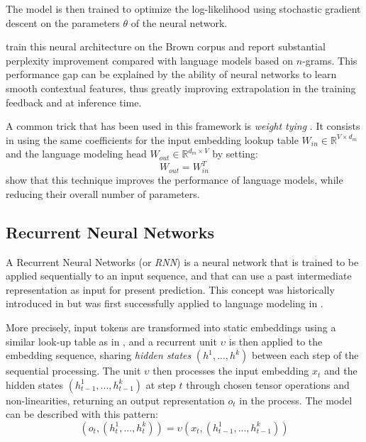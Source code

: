 The model is then trained to optimize the log-likelihood using stochastic gradient descent \citep{sgd} on the parameters $\theta$ of the neural network.

\citet{bengio2000neural} train this neural architecture on the Brown corpus \citep{francis79browncorpus} and report substantial perplexity improvement compared with language models based on $n$-grams. This performance gap can be explained by the ability of neural networks to learn smooth contextual features, thus greatly improving extrapolation in the training feedback and at inference time.

A common trick that has been used in this framework is \textit{weight tying} \citep{press-wolf-2017-using}. It consists in using the same coefficients for the input embedding lookup table $W_{in} \in \mathbb{R}^{V \times d_m}$ and the language modeling head $W_{out} \in \mathbb{R}^{d_m \times V}$ by setting:
$$
W_{out} = W_{in}^T
$$
\citet{press-wolf-2017-using} show that this technique improves the performance of language models, while reducing their overall number of parameters.

\subsection{Recurrent Neural Networks}

A Recurrent Neural Networks (or \textit{RNN}) is a neural network that is trained to be applied sequentially to an input sequence, and that can use a past intermediate representation as input for present prediction. This concept was historically introduced in \citet{rnn_origins} but was first successfully applied to language modeling in \citet{mikolov10_interspeech}.

More precisely, input tokens are transformed into static embeddings using a similar look-up table as in \citet{bengio2000neural}, and a recurrent unit $\upsilon$ is then applied to the embedding sequence, sharing \textit{hidden states} $(h^1,...,h^k)$ between each step of the sequential processing. The unit $\upsilon$ then processes the input embedding $x_t$ and the hidden states $(h_{t-1}^1,...,h_{t-1}^k)$ at step $t$ through chosen tensor operations and non-linearities, returning an output representation $o_t$ in the process. The model can be described with this pattern:
$$
\left(o_{t}, (h_{t}^1,...,h_{t}^k)\right) = \upsilon \left(x_t, (h_{t-1}^1,...,h_{t-1}^k)\right)
$$


